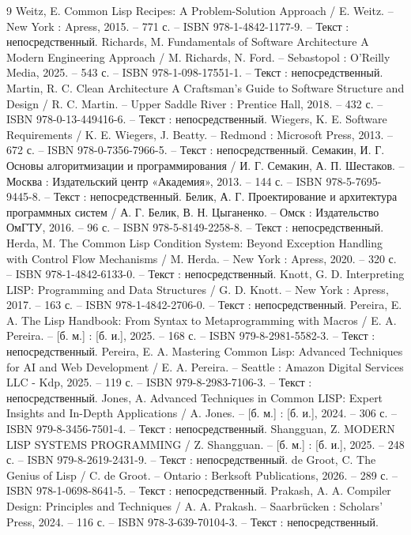\begin{thebibliography}{9}
 Weitz, E. Common Lisp Recipes: A Problem-Solution Approach / E. Weitz. -- New York : Apress, 2015. -- 771 с. -- ISBN 978-1-4842-1177-9. -- Текст : непосредственный.
 Richards, M. Fundamentals of Software Architecture A Modern Engineering Approach / M. Richards, N. Ford. -- Sebastopol : O'Reilly Media, 2025. -- 543 с. -- ISBN 978-1-098-17551-1. -- Текст : непосредственный.
 Martin, R. C. Clean Architecture A Craftsman's Guide to Software Structure and Design / R. C. Martin. -- Upper Saddle River : Prentice Hall, 2018. -- 432 с. -- ISBN 978-0-13-449416-6. -- Текст : непосредственный.
 Wiegers, K. E. Software Requirements / K. E. Wiegers, J. Beatty. -- Redmond : Microsoft Press, 2013. -- 672 с. -- ISBN 978-0-7356-7966-5. -- Текст : непосредственный.
 Семакин, И. Г. Основы алгоритмизации и программирования / И. Г. Семакин, А. П. Шестаков. -- Москва : Издательский центр «Академия», 2013. -- 144 с. -- ISBN 978-5-7695-9445-8. -- Текст : непосредственный.
 Белик, А. Г. Проектирование и архитектура программных систем / А. Г. Белик, В. Н. Цыганенко. -- Омск : Издательство ОмГТУ, 2016. -- 96 с. -- ISBN 978-5-8149-2258-8. -- Текст : непосредственный.
 Herda, M. The Common Lisp Condition System: Beyond Exception Handling with Control Flow Mechanisms / M. Herda. -- New York : Apress, 2020. -- 320 с. -- ISBN 978-1-4842-6133-0. -- Текст : непосредственный.
 Knott, G. D. Interpreting LISP: Programming and Data Structures / G. D. Knott. -- New York : Apress, 2017. -- 163 с. -- ISBN 978-1-4842-2706-0. -- Текст : непосредственный.
 Pereira, E. A. The Lisp Handbook: From Syntax to Metaprogramming with Macros / E. A. Pereira. -- [б. м.] : [б. и.], 2025. -- 168 с. -- ISBN 979-8-2981-5582-3. -- Текст : непосредственный.
 Pereira, E. A. Mastering Common Lisp: Advanced Techniques for AI and Web Development / E. A. Pereira. -- Seattle : Amazon Digital Services LLC - Kdp, 2025. -- 119 с. -- ISBN 979-8-2983-7106-3. -- Текст : непосредственный.
 Jones, A. Advanced Techniques in Common LISP: Expert Insights and In-Depth Applications / A. Jones. -- [б. м.] : [б. и.], 2024. -- 306 с. -- ISBN 979-8-3456-7501-4. -- Текст : непосредственный.
 Shangguan, Z. MODERN LISP SYSTEMS PROGRAMMING / Z. Shangguan. -- [б. м.] : [б. и.], 2025. -- 248 с. -- ISBN 979-8-2619-2431-9. -- Текст : непосредственный.
 de Groot, C. The Genius of Lisp / C. de Groot. -- Ontario : Berksoft Publications, 2026. -- 289 с. -- ISBN 978-1-0698-8641-5. -- Текст : непосредственный.
 Prakash, A. A. Compiler Design: Principles and Techniques / A. A. Prakash. -- Saarbrücken : Scholars' Press, 2024. -- 116 с. -- ISBN 978-3-639-70104-3. -- Текст : непосредственный.

\end{thebibliography}
